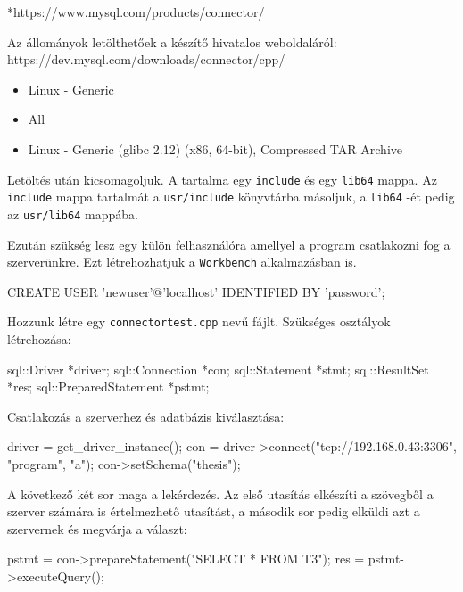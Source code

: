 *https://www.mysql.com/products/connector/


Az állományok letölthetőek a készítő hivatalos weboldaláról:\newline
https://dev.mysql.com/downloads/connector/cpp/
\begin{itemize}
	\item Linux - Generic
	\item All
	\item Linux - Generic (glibc 2.12) (x86, 64-bit), Compressed TAR Archive
\end{itemize}
Letöltés után kicsomagoljuk. A tartalma egy \texttt{include} és egy \texttt{lib64} mappa. Az \texttt{include} mappa tartalmát a \texttt{usr/include} könyvtárba másoljuk, a \texttt{lib64} -ét pedig az \texttt{usr/lib64} mappába.

Ezután szükség lesz egy külön felhasználóra amellyel a program csatlakozni fog a szerverünkre. Ezt létrehozhatjuk a \texttt{Workbench} alkalmazásban is.
\begin{python}
	CREATE USER 'newuser'@'localhost' IDENTIFIED BY 'password';
\end{python}


Hozzunk létre egy \texttt{connectortest.cpp} nevű fájlt.
Szükséges osztályok létrehozása:
\begin{cpp}
	sql::Driver *driver;
	sql::Connection *con;
	sql::Statement *stmt;
	sql::ResultSet *res;
	sql::PreparedStatement *pstmt;
\end{cpp}
Csatlakozás a szerverhez és adatbázis kiválasztása:
\begin{cpp}
	driver = get_driver_instance();
	con = driver->connect("tcp://192.168.0.43:3306", "program", "a");
	con->setSchema("thesis");
\end{cpp}
A következő két sor maga a lekérdezés. Az első utasítás elkészíti a szövegből a szerver számára is értelmezhető utasítást, a második sor pedig elküldi azt a szervernek és megvárja a választ:
\begin{cpp}
	pstmt = con->prepareStatement("SELECT * FROM T3");
	res = pstmt->executeQuery();
\end{cpp}

